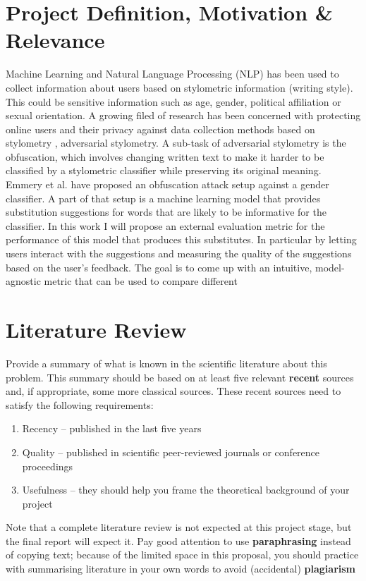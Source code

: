 \documentclass[11pt, a4paper]{article}
\begin{document}


\section{Project Definition, Motivation \& Relevance} \label{sec:introduction}
Machine Learning and Natural Language Processing (NLP) has been used to collect information about users based on stylometric information (writing style).
This could be sensitive information such as age, gender, political affiliation or sexual orientation.
A growing filed of research has been concerned with protecting online users and their privacy against data collection methods based on stylometry \citep{}, adversarial stylometry.
A sub-task of adversarial stylometry is the obfuscation, which involves changing written text to make it harder to be classified by a stylometric classifier while preserving its original meaning.
Emmery et al. \citep{emmer2019obfuscation} have proposed an obfuscation attack setup against a gender classifier. A part of that setup is a machine learning model that provides substitution suggestions for words that are likely to be informative for the classifier.
In this work I will propose an external evaluation metric for the performance of this model that produces this substitutes. In particular by letting users interact with the suggestions and measuring the quality of the suggestions based on the user's feedback.
The goal is to come up with an intuitive, model-agnostic metric that can be used to compare different 
\section{Literature Review}
Provide a summary of what is known in the scientific literature about this problem. This summary should be based on at least five relevant \textbf{recent} sources and, if appropriate, some more classical sources. These recent sources need to satisfy the following requirements: 
\begin{enumerate}
    \item Recency – published in the last five years
    \item Quality – published in scientific peer-reviewed journals or conference proceedings
    \item Usefulness – they should help you frame the theoretical background of your project
\end{enumerate}
Note that a complete literature review is not expected at this project stage, but the final report will expect it. Pay good attention to use  \textbf{paraphrasing} instead of copying text; because of the limited space in this proposal, you should practice with summarising literature in your own words to avoid (accidental) \textbf{plagiarism}
\end{document}
